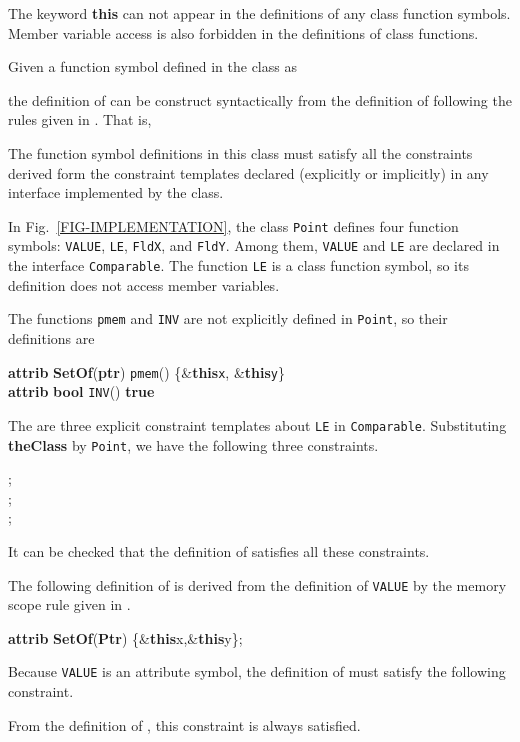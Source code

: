\documentclass[fleqn]{llncs}
\begin{document}
The keyword \textbf{this} can not appear in the definitions of any class function symbols. Member variable access  is also forbidden in the definitions of class functions.

Given a function symbol  defined in the class as
    
the definition of  can be construct syntactically from the definition of  following the rules given in \cite{DBLP:conf/ictac/ZhaoL13}. That is,
    

The function symbol definitions in this class must satisfy all the constraints derived form the constraint templates  declared (explicitly or implicitly) in any interface implemented by the class.

\begin{example}
In Fig.~\ref{FIG-IMPLEMENTATION}, the class \texttt{Point} defines four function symbols: \texttt{VALUE}, \texttt{LE}, \texttt{FldX}, and \texttt{FldY}.
Among them, \texttt{VALUE} and \texttt{LE} are declared in the interface \texttt{Comparable}. The function \texttt{LE} is a class function symbol, so its definition does not access
member variables.

The functions \texttt{pmem} and \texttt{INV} are not explicitly defined in \texttt{Point}, so their definitions are
\begin{center}
\begin{minipage}{0.7\textwidth}
\textbf{attrib} \textbf{SetOf}(\textbf{ptr}) \texttt{pmem}()  \{\&\textbf{this}\fldacc\texttt{x}, \&\textbf{this}\fldacc\texttt{y}\}\\
\textbf{attrib} \textbf{bool}    \texttt{INV}()  \textbf{true}
\end{minipage}
\end{center}
The are three explicit constraint templates about \texttt{LE} in \texttt{Comparable}. Substituting \textbf{theClass} by \texttt{Point}, we have the following three constraints.
\begin{center}
\begin{minipage}{0.95\textwidth}
;\\
;\\
;
\end{minipage}
\end{center}
It can be checked that the definition of  satisfies all these constraints.

The following definition of  is derived from the definition of \texttt{VALUE} by the memory scope rule given in \cite{DBLP:conf/ictac/ZhaoL13}.
\begin{center}\textbf{attrib} \textbf{SetOf}(\textbf{Ptr}) \{\&\textbf{this}\fldacc x,\&\textbf{this}\fldacc y\};\end{center}
Because \texttt{VALUE} is an attribute symbol, the definition of  must satisfy the following constraint.

From the definition of , this constraint is always satisfied.
\hfill
\end{example}
\end{document}
